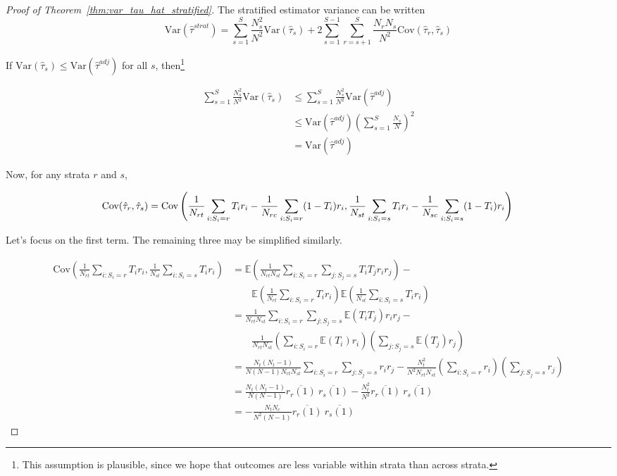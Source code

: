 \documentclass[12pt]{article}
\newcommand{\beq}{\begin{equation}}
\newcommand{\eeq}{\end{equation}}
\newcommand{\ex}{\mathbb{E}} %
\newcommand{\var}{\textrm{Var}}
\newcommand{\cov}{\textrm{Cov}}
\begin{document}
\begin{proof}[Proof of Theorem~\ref{thm:var_tau_hat_stratified}]
The stratified estimator variance can be written
\beq\label{eqn:var_tau_hat_strat}
\var\left(\hat{\tau}^{strat}\right) = \sum_{s=1}^S \frac{N_s^2}{N^2} \var(\hat{\tau}_s) + 2\sum_{s=1}^{S-1}\sum_{r=s+1}^{S} \frac{N_rN_s}{N^2}\cov(\hat{\tau}_r, \hat{\tau}_s) 
\eeq

\noindent If $\var(\hat{\tau}_s) \leq \var(\hat{\tau}^{adj})$ for all $s$,
then\footnote{
This assumption is plausible, since we hope that outcomes are less variable within strata than across strata.}

\begin{align*}
 \sum_{s=1}^S \frac{N_s^2}{N^2} \var(\hat{\tau}_s) &\leq  \sum_{s=1}^S \frac{N_s^2}{N^2} \var(\hat{\tau}^{adj}) \\
 &\leq \var(\hat{\tau}^{adj}) \left( \sum_{s=1}^S \frac{N_s}{N} \right)^2 \tag*{by Jensen's inequality} \\
 &= \var(\hat{\tau}^{adj})
\end{align*} 

\noindent Now, for any strata $r$ and $s$,

\beq
\cov(\hat{\tau}_r, \hat{\tau}_s) = \cov\left( \frac{1}{N_{rt}} \sum_{i: S_i = r} T_i r_i - \frac{1}{N_{rc}} \sum_{i: S_i = r} (1-T_i)r_i , \frac{1}{N_{st}} \sum_{i: S_i = s} T_i r_i - \frac{1}{N_{sc}} \sum_{i: S_i = s} (1-T_i)r_i \right) \\
\eeq

\noindent Let's focus on the first term.
The remaining three may be simplified similarly.

\begin{align*}
\cov\left( \frac{1}{N_{rt}} \sum_{i: S_i = r} T_i r_i, \frac{1}{N_{st}} \sum_{i: S_i = s} T_i r_i \right) &= 
\ex\left( \frac{1}{N_{rt}N_{st}} \sum_{i : S_i=r}\sum_{j : S_j = s} T_i T_j r_i r_j \right) - \\
&\qquad \ex\left(  \frac{1}{N_{rt}} \sum_{i: S_i = r} T_i r_i\right) \ex\left(  \frac{1}{N_{st}} \sum_{i: S_i = s} T_i r_i \right) \\
&=  \frac{1}{N_{rt}N_{st}} \sum_{i : S_i=r}\sum_{j : S_j = s} \ex(T_i T_j)r_i r_j  - \\
& \qquad \frac{1}{N_{rt}N_{st}} \left(\sum_{i : S_i=r}\ex(T_i)r_i \right)\left(\sum_{j : S_j=s}\ex(T_j)r_j\right) \\
&=  \frac{N_t(N_t - 1)}{N(N-1)N_{rt}N_{st}} \sum_{i : S_i=r}\sum_{j : S_j = s}  r_i r_j  -  \frac{N_t^2}{N^2N_{rt}N_{st}} \left(\sum_{i : S_i=r}r_i \right)\left(\sum_{j : S_j=s}r_j\right) \\
&=  \frac{N_t(N_t - 1)}{N(N-1)}\overline{r_r(1)}~\overline{r_s(1)}  -  \frac{N_t^2}{N^2} \overline{r_r(1)}~\overline{r_s(1)} \\
&= -\frac{N_tN_c}{N^2(N-1)} \overline{r_r(1)}~\overline{r_s(1)}
\end{align*}


\end{proof}
\end{document}
